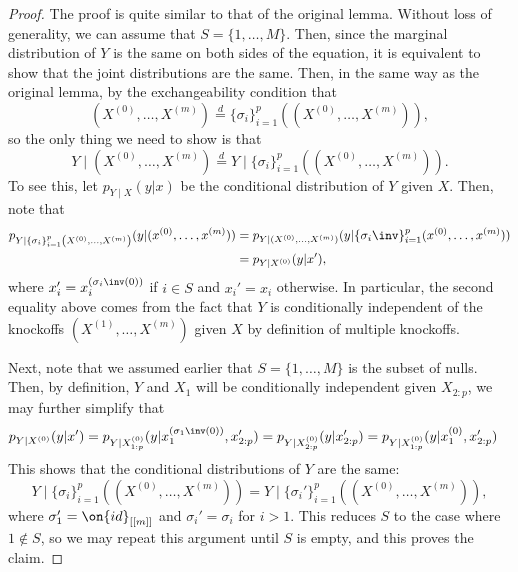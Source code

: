 \documentclass[11pt,reqno]{report}
\theoremstyle{definition}
\numberwithin{equation}{section}
\begin{document}
\begin{proof}
The proof is quite similar to that of the original lemma. Without loss of generality, we can assume that $S = \{ 1, \ldots, M \}$. Then, since the marginal distribution of $Y$ is the same on both sides of the equation, it is equivalent to show that the joint distributions are the same. Then, in the same way as the original lemma, by the exchangeability condition that \[ (X^{(0)}, \ldots, X^{(m)}) \overset{d}= \{ \sigma_i \}_{i=1}^p \left( (X^{(0)}, \ldots, X^{(m)}) \right),\] so the only thing we need to show is that 
\begin{equation}
Y \mid (X^{(0)}, \ldots, X^{(m)}) \overset{d}= Y \mid \{ \sigma_i \}_{i=1}^p \left( (X^{(0)}, \ldots, X^{(m)}) \right).
\end{equation}
To see this, let $p_{Y \mid X}(y|x)$ be the conditional distribution of $Y$ given $X$. Then, note that
\begin{align*}
p_{Y \mid \{ \sigma_i \}_{i=1}^p \left( X^{(0)}, \ldots, X^{(m)} \right)}(y | (x^{(0)}, \ldots , x^{(m)})) &= p_{Y \mid (X^{(0)}, \ldots, X^{(m)})} (y| \{ \sigma_i\inv \}_{i=1}^p (x^{(0)}, \ldots, x^{(m)}) ) \\
&= p_{Y \mid X^{(0)}} (y| x'),
\end{align*}
where $x_i' = x^{(\sigma_i\inv(0))}_i$ if $i \in S$ and $x_i' = x_i$ otherwise. In particular, the second equality above comes from the fact that $Y$ is conditionally independent of the knockoffs $(X^{(1)}, \ldots, X^{(m)})$ given $X$ by definition of multiple knockoffs.

Next, note that we assumed earlier that $S = \{ 1, \ldots, M \}$ is the subset of nulls. Then, by definition, $Y$ and $X_1$ will be conditionally independent given $X_{2 : p}$, we may further simplify that
\begin{align*}
p_{Y \mid X^{(0)}} (y| x') &= p_{Y \mid X^{(0)}_{1 : p}} (y | x^{(\sigma_1\inv(0))}_1, x'_{2 : p}) = p_{Y \mid X^{(0)}_{2 : p}} (y | x'_{2 : p}) = p_{Y \mid X^{(0)}_{1 : p}} (y | x_1^{(0)}, x'_{2 : p})
\end{align*}
This shows that the conditional distributions of $Y$ are the same:
\[ Y \mid \{ \sigma_i \}_{i=1}^p \left( (X^{(0)}, \ldots, X^{(m)}) \right) = Y \mid \{ \sigma_i' \}_{i=1}^p \left( (X^{(0)}, \ldots, X^{(m)}) \right), \] where $\sigma_1' = \on{id}_{[[m]]}$ and $\sigma_i' = \sigma_i$ for $i  > 1$. This reduces $S$ to the case where $1 \not \in S$, so we may repeat this argument until $S$ is empty, and this proves the claim.
\end{proof}
\end{document}
